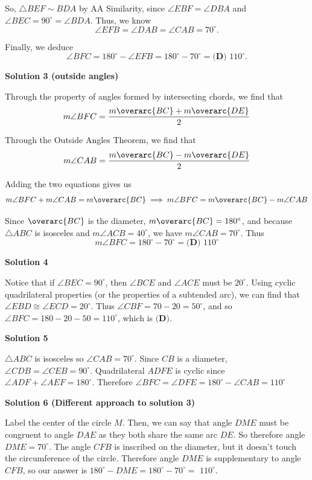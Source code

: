 \begin{enumerate}
 So, $\triangle BEF \sim BDA$ by AA Similarity, since $\angle EBF = \angle DBA$ and $\angle BEC = 90^{\circ} = \angle BDA$. Thus, we know 
 \[\angle EFB = \angle DAB = \angle CAB = 70^{\circ}.\]

 Finally, we deduce 
 \[\angle BFC = 180^{\circ} - \angle EFB = 180^{\circ} - 70^{\circ} = \boxed{\textbf{(D) } 110^{\circ}}.\]




\textbf{Solution 3 (outside angles)}

Through the property of angles formed by intersecting chords, we find that
 \[m\angle BFC=\frac{m\overarc{BC}+m\overarc{DE}}{2}\]

 Through the Outside Angles Theorem, we find that
 \[m\angle CAB = \frac{m\overarc{BC}-m\overarc{DE}}{2}\]

 Adding the two equations gives us
 \[m\angle BFC + m\angle CAB = m\overarc{BC}\implies m\angle BFC=m\overarc{BC} - m\angle CAB\]

 Since $\overarc{BC}$ is the diameter, $m\overarc{BC}=180^{\circ}$, and because $\triangle ABC$ is isosceles and $m\angle ACB=40^{\circ}$, we have $m\angle CAB=70^{\circ}$. Thus
 \[m\angle BFC=180^{\circ}-70^{\circ}=\boxed{\textbf{(D) } 110^{\circ}}\]




\textbf{Solution 4}

Notice that if $\angle BEC = 90^{\circ}$, then $\angle BCE$ and $\angle ACE$ must be $20^{\circ}$. Using cyclic quadrilateral properties (or the properties of a subtended arc), we can find that $\angle EBD \cong \angle ECD = 20^{\circ}$. Thus $\angle CBF = 70 - 20 = 50^{\circ}$, and so $\angle BFC = 180 - 20 - 50 = 110^{\circ}$, which is $\boxed{\textbf{(D)}}$.

 



\textbf{Solution 5}

$\triangle{ABC}$ is isosceles so $\angle{CAB}=70^{\circ}$. Since $CB$ is a diameter, $\angle{CDB}=\angle{CEB}=90^{\circ}$. Quadrilateral $ADFE$ is cyclic since $\angle{ADF}+\angle{AEF}=180^{\circ}$. Therefore $\angle{BFC}=\angle{DFE}=180^{\circ}-\angle{CAB}=\boxed{110^{\circ}}$




\textbf{Solution 6 (Different approach to solution 3)}

Label the center of the circle \( M \). Then, we can say that angle \( DME \) must be congruent to angle \( DAE \) as they both share the same arc \( DE \). So therefore angle \( DME = 70^\circ \). The angle \( CFB \) is inscribed on the diameter, but it doesn't touch the circumference of the circle. Therefore angle \( DME \) is supplementary to angle \( CFB \), so our answer is \( 180^\circ - DME = 180^\circ - 70^\circ = \) $\boxed{110^{\circ}}$.


\end{enumerate}
